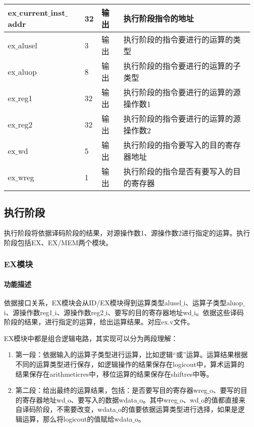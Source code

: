 \begin{table}[H]
\begin{tabular}{|l|l|l|l|}
		\hline
		ex$\_$current$\_$inst$\_$addr & 32 & 输出 & 执行阶段指令的地址 \\
		\hline
		ex$\_$alusel & 3 & 输出 & 执行阶段的指令要进行的运算的类型 \\
		\hline
		ex$\_$aluop & 8 & 输出 & 执行阶段的指令要进行的运算的子类型 \\
		\hline
		ex$\_$reg1 & 32 & 输出 & 执行阶段的指令要进行的运算的源操作数1 \\
		\hline
		ex$\_$reg2 & 32 & 输出 & 执行阶段的指令要进行的运算的源操作数2 \\
		\hline
		ex$\_$wd & 5 & 输出 & 执行阶段的指令要写入的目的寄存器地址 \\
		\hline
		ex$\_$wreg & 1 & 输出 & 执行阶段的指令是否有要写入的目的寄存器 \\
		\hline
	\end{tabular}
\end{table}
\subsection{执行阶段}
执行阶段将依据译码阶段的结果，对源操作数1、源操作数2进行指定的运算。执行阶段包括EX、EX/MEM两个模块。
\subsubsection{EX模块}
\paragraph{功能描述}
\quad

\quad

依据接口关系，EX模块会从ID/EX模块得到运算类型alusel$\_$i、运算子类型aluop$\_$i、源操作数reg1$\_$i、源操作数reg2$\_$i、要写的目的寄存器地址wd$\_$i。依据这些译码阶段的结果，进行指定的运算，给出运算结果。对应ex.v文件。

EX模块中都是组合逻辑电路，其实现可以分为两段理解：
\begin{enumerate}[(1)]
	\item 第一段：依据输入的运算子类型进行运算，比如逻辑“或”运算。运算结果根据不同的运算类型进行保存，如逻辑操作的结果保存在logicout中，算术运算的结果保存在arithmeticres中，移位运算的结果保存在shiftres中等。
	
	\item 第二段：给出最终的运算结果，包括：是否要写目的寄存器wreg$\_$o、要写的目的寄存器地址wd$\_$o、要写入的数据wdata$\_$o。其中wreg$\_$o、wd$\_$o的值都直接来自译码阶段，不需要改变，wdata$\_$o的值要依据运算类型进行选择，如果是逻辑运算，那么将logicout的值赋给wdata$\_$o。
\end{enumerate}
